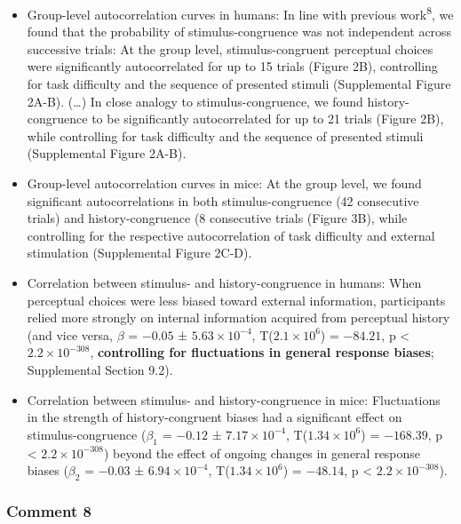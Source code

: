 \documentclass[
]{article}
\begin{document}
\begin{itemize}
\item
  Group-level autocorrelation curves in humans: In line with previous
  work\textsuperscript{8}, we found that the probability of
  stimulus-congruence was not independent across successive trials: At
  the group level, stimulus-congruent perceptual choices were
  significantly autocorrelated for up to 15 trials (Figure 2B),
  controlling for task difficulty and the sequence of presented stimuli
  (Supplemental Figure 2A-B). (\ldots) In close analogy to
  stimulus-congruence, we found history-congruence to be significantly
  autocorrelated for up to 21 trials (Figure 2B), while controlling for
  task difficulty and the sequence of presented stimuli (Supplemental
  Figure 2A-B).
\item
  Group-level autocorrelation curves in mice: At the group level, we
  found significant autocorrelations in both stimulus-congruence (42
  consecutive trials) and history-congruence (8 consecutive trials
  (Figure 3B), while controlling for the respective autocorrelation of
  task difficulty and external stimulation (Supplemental Figure 2C-D).
\item
  Correlation between stimulus- and history-congruence in humans: When
  perceptual choices were less biased toward external information,
  participants relied more strongly on internal information acquired
  from perceptual history (and vice versa, \(\beta\) = \(-0.05\) ±
  \(\ensuremath{5.63\times 10^{-4}}\),
  T(\(\ensuremath{2.1\times 10^{6}}\)) = \(-84.21\), p < \(\ensuremath{2.2\times 10^{-308}}\),
  \textbf{controlling for fluctuations in general response biases};
  Supplemental Section 9.2).
\item
  Correlation between stimulus- and history-congruence in mice:
  Fluctuations in the strength of history-congruent biases had a
  significant effect on stimulus-congruence (\(\beta_1\) = \(-0.12\) ±
  \(\ensuremath{7.17\times 10^{-4}}\),
  T(\(\ensuremath{1.34\times 10^{6}}\)) = \(-168.39\), p < \(\ensuremath{2.2\times 10^{-308}}\)) beyond
  the effect of ongoing changes in general response biases (\(\beta_2\)
  = \(-0.03\) ± \(\ensuremath{6.94\times 10^{-4}}\),
  T(\(\ensuremath{1.34\times 10^{6}}\)) = \(-48.14\), p < \(\ensuremath{2.2\times 10^{-308}}\)).
\end{itemize}

\hypertarget{comment-8-1}{%
\subsubsection{Comment 8}\label{comment-8-1}}
\end{document}
